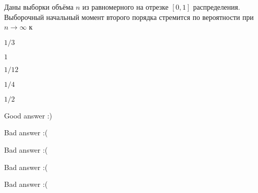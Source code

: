 
\begin{question}
Даны выборки объёма \(n\) из равномерного на отрезке \([0,1]\)
распределения. Выборочный начальный момент второго порядка стремится по
вероятности при \(n \stackrel{}{\to} \infty\) к
\begin{answerlist}
  \item \(1/3\)
  \item \(1\)
  \item \(1/12\)
  \item \(1/4\)
  \item \(1/2\)
\end{answerlist}
\end{question}

\begin{solution}
\begin{answerlist}
  \item Good answer :)
  \item Bad answer :(
  \item Bad answer :(
  \item Bad answer :(
  \item Bad answer :(
\end{answerlist}
\end{solution}

